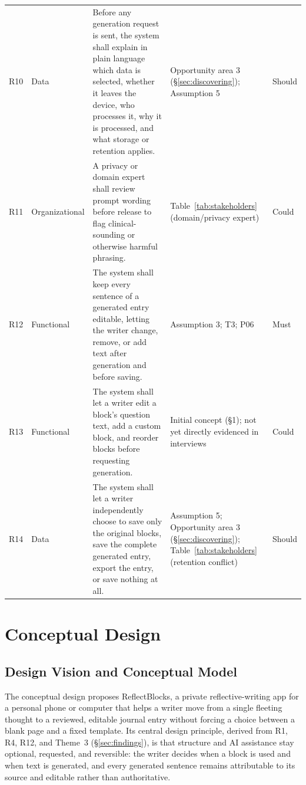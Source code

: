 \documentclass[sigconf,nonacm]{acmart}
\begin{document}
\begin{table}[tb]
\begin{tabularx}{\textwidth}{@{}l l Z Y l@{}}
    R10 & Data & Before any generation request is sent, the system shall explain in plain language which data is selected, whether it leaves the device, who processes it, why it is processed, and what storage or retention applies. & Opportunity area 3 (\S\ref{sec:discovering}); Assumption 5 & Should \\
    R11 & Organizational & A privacy or domain expert shall review prompt wording before release to flag clinical-sounding or otherwise harmful phrasing. & Table~\ref{tab:stakeholders} (domain/privacy expert) & Could \\
    R12 & Functional & The system shall keep every sentence of a generated entry editable, letting the writer change, remove, or add text after generation and before saving. & Assumption 3; T3; P06 & Must \\
    R13 & Functional & The system shall let a writer edit a block's question text, add a custom block, and reorder blocks before requesting generation. & Initial concept (\S1); not yet directly evidenced in interviews & Could \\
    R14 & Data & The system shall let a writer independently choose to save only the original blocks, save the complete generated entry, export the entry, or save nothing at all. & Assumption 5; Opportunity area 3 (\S\ref{sec:discovering}); Table~\ref{tab:stakeholders} (retention conflict) & Should \\
    \bottomrule
  \end{tabularx}
\end{table}

\section{Conceptual Design}
\label{sec:design}

\subsection{Design Vision and Conceptual Model}

The conceptual design proposes ReflectBlocks, a private reflective-writing app
for a personal phone or computer that helps a writer move from a single
fleeting thought to a reviewed, editable journal entry without forcing a
choice between a blank page and a fixed template. Its central design
principle, derived from R1, R4, R12, and Theme~3 (\S\ref{sec:findings}), is
that structure and AI assistance stay optional, requested, and reversible: the
writer decides when a block is used and when text is generated, and every
generated sentence remains attributable to its source and editable rather than
authoritative.
\end{document}
